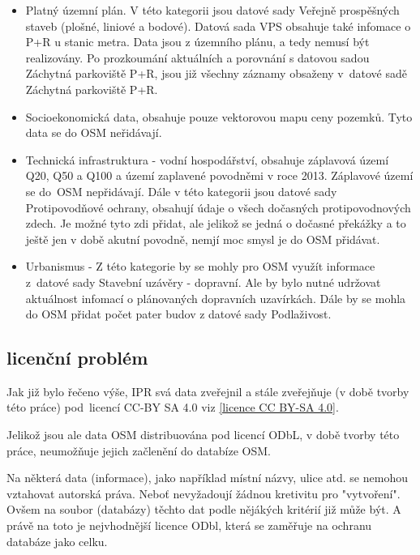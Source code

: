 \begin{itemize}
    \item   Platný územní plán. V této kategorii jsou datové sady Veřejně prospěšných
            staveb (plošné, liniové a bodové). Datová sada VPS obsahuje také
            infomace o P+R u stanic metra. Data jsou z územního plánu, a tedy nemusí
            být realizovány. Po prozkoumání aktuálních a porovnání s datovou sadou
            Záchytná parkoviště P+R, jsou již všechny záznamy obsaženy v~datové
            sadě Záchytná parkoviště P+R.

    \item   Socioekonomická data, obsahuje pouze vektorovou mapu ceny pozemků.
            Tyto data se do OSM neřidávají.

    \item   Technická infrastruktura - vodní hospodářství, obsahuje záplavová území
            Q20, Q50 a Q100 a území zaplavené povodněmi v roce 2013. Záplavové území
            se do~OSM nepřidávají. Dále v této kategorii jsou datové sady
            Protipovodňové ochrany, obsahují údaje o všech dočasných protipovodnových
            zdech. Je možné tyto zdi přidat, ale jelikož se jedná o dočasné překážky
            a to ještě jen v době akutní povodně, nemjí moc smysl je do OSM přidávat.

    \item   Urbanismus - Z této kategorie by se mohly pro OSM využít informace
            z~datové sady Stavební uzávěry - dopravní. Ale by bylo nutné udržovat
            aktuálnost infomací o plánovaných dopravních uzavírkách.
            Dále by se mohla do OSM přidat počet pater budov z datové sady
            Podlaživost.
\end{itemize}


\subsection{licenční problém}
\label{licenční problém}
Jak již bylo řečeno výše, IPR svá data zveřejnil a stále zveřejňuje
(v době tvorby této práce) pod~licencí CC-BY SA 4.0 viz \ref{licence CC BY-SA 4.0}.

Jelikož jsou ale data OSM distribuována pod licencí ODbL,
v době tvorby této práce, neumožňuje jejich začlenění do databíze OSM.

Na některá data (informace), jako například místní
názvy, ulice atd. se nemohou vztahovat autorská práva. Neboť nevyžadoují žádnou
kretivitu pro "vytvoření". Ovšem na soubor (databázy) těchto dat podle nějákých
kritérií již může být. A právě na toto je nejvhodnější licence ODbl, která se
zaměřuje na ochranu databáze jako celku. 

